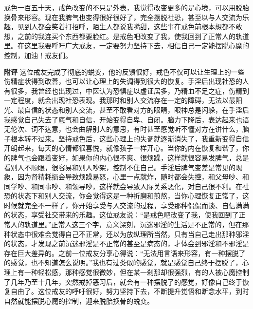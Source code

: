 \begin{case}
    戒色一百五十天，戒色改变的不只是外表，我觉得改变更多的是心境，可以用脱胎换骨来形容。现在我脾气也变得很好很好了，完全摆脱社恐，甚至以与人交流为乐趣，见到人都会笑着打招呼，陌生人都说我嘴甜，这些事在戒色前根本想都不敢想，之前的我连买个东西都要脸红。是戒色吧改变了我，使我回到了正常人的轨道里。在这里我要呼吁广大戒友，一定要努力坚持下去，相信自己一定能摆脱心魔的控制，加油！戒友们。

    \textbf{附评} 这位戒友完成了彻底的蜕变，他的反馈很好，戒色不仅可以让生理上的一些伤精症状得到改善，也可以让心理上的失调得到很大的恢复。手淫后出现社恐的人有很多，我曾经也出现过，中医认为恐惧症以虚证居多，乃精血不足之症，伤精到一定程度，就会出现社恐表现。我那时和别人交流存在一定的障碍，无法以最阳光、最自信的状态和别人交流，甚至不敢看对方的眼睛，眼神总是闪躲，在手淫后我感觉自己失去了底气和自信，开始变得自卑、自闭。脑力下降后，表达起来也语无伦次、词不达意，也会曲解别人的意思，有时甚至感觉听不懂对方在讲什么，脑子根本转不过来。坚持戒色后，这些心理上的失调就逐渐消失了，我重新变得自信开朗起来，每天的心情都很喜悦，就像孩子一样开心。当你的内在恢复和谐了，你的脾气也会跟着变好，如果你的内心很不爽、很烦躁，这样就很容易发脾气，总是看别人不顺眼，很容易和别人吵架，控制不住自己。手淫后脾气变差是常见的现象，因为肾精耗损会导致烦躁易怒，心里一点就炸，随时都会失控，和父母吵、和同学吵、和同事吵、和领导吵，这样就会导致人际关系恶化，对自己很不利。在社恐的状态下和别人交流，你会觉得这是一种折磨和煎熬，当你心理恢复正常了，这时候就完全不一样了，你开始享受与人交流的过程，享受那种侃侃而谈、自信满满的状态，享受社交带来的乐趣。这位戒友说：“是戒色吧改变了我，使我回到了正常人的轨道里。”正常人这三个字，意义深刻，沉迷邪淫的生活是不正常的，但在那种状态中很难会觉得自己不正常，还以为放纵理所当然，只有当自己走出那种邪淫的状态，才发现之前沉迷邪淫是不正常的甚至是病态的，才体会到邪淫和不邪淫是存在巨大差异的。之前一位戒友分享心得说：“无法用言语来形容，有一种摆脱了的感觉，也不知道怎么说明。”我也有过类似的感觉，就是感觉自己终于摆脱了，心理上有一种轻松感，那种感觉很微妙，但在某一刹那却很强烈，有的人被心魔控制了几年乃至十几年，突然戒掉恶习后，就会有一种摆脱了的感觉，好像自己终于恢复自由了。这位戒友的呼吁很好，努力坚持下去，不断提升觉悟和断念水平，到时自然就能摆脱心魔的控制，迎来脱胎换骨的蜕变。
\end{case}

